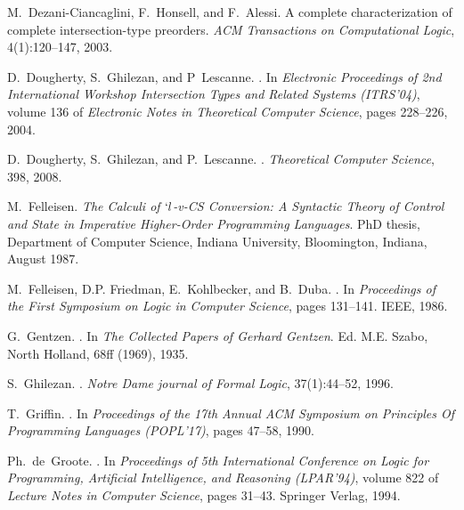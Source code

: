 \documentclass{CSML}
\begin{document}
\begin{thebibliography}{10}
M.~Dezani-Ciancaglini, F.~Honsell, and F.~Alessi.
\newblock A complete characterization of complete intersection-type preorders.
\newblock \emph{ACM Transactions on Computational Logic}, 4(1):120--147, 2003.

D.~Dougherty, S.~Ghilezan, and P~Lescanne.
.
\newblock In \emph{Electronic Proceedings of 2nd International Workshop {\em
 Intersection Types and Related Systems} (ITRS'04)}, volume 136 of {\em
 Electronic Notes in Theoretical Computer Science}, pages 228--226, 2004.

D.~Dougherty, S.~Ghilezan, and P.~Lescanne.
.
\newblock \emph{Theoretical Computer Science}, 398, 2008.

M.~Felleisen.
\newblock \emph{{The Calculi of $`l$-v-CS Conversion: A Syntactic Theory of
 Control and State in Imperative Higher-Order Programming Languages}}.
\newblock PhD thesis, Department of Computer Science, Indiana University,
 Bloomington, Indiana, August 1987.

M.~Felleisen, D.P. Friedman, E.~Kohlbecker, and B.~Duba.
.
\newblock In \emph{Proceedings of the First Symposium on Logic in Computer
 Science}, pages 131--141. IEEE, 1986.

G.~Gentzen.
.
\newblock In \emph{The Collected Papers of Gerhard Gentzen}. Ed. M.E. Szabo,
 North Holland, 68ff (1969), 1935.

S.~Ghilezan.
.
\newblock \emph{Notre Dame journal of Formal Logic}, 37(1):44--52, 1996.

T.~Griffin.
.
\newblock In \emph{Proceedings of the 17th Annual {ACM} Symposium on Principles
 Of Programming Languages (POPL'17)}, pages 47--58, 1990.

Ph.~de~Groote.
.
\newblock In \emph{Proceedings of 5th International Conference on Logic for
 Programming, Artificial Intelligence, and Reasoning (LPAR'94)}, volume 822 of
 \emph{Lecture Notes in Computer Science}, pages 31--43. Springer Verlag, 1994.


\end{thebibliography}
\end{document}
